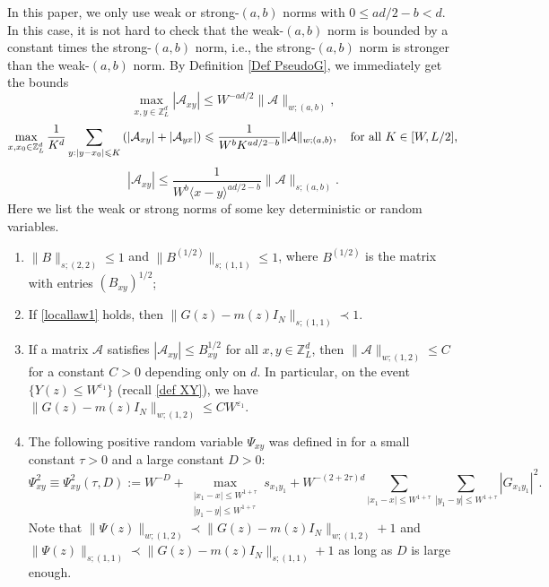 \documentclass{article}
\newcommand{\1}{\mathds{1}}
\numberwithin{equation}{section}
\newcommand{\be}{\begin{equation}}
\newcommand{\ee}{\end{equation}}
\newcommand{\e}{{\varepsilon}}
\renewcommand{\cal}{\mathcal}
\renewcommand{\leq}{\leqslant}
\renewcommand{\le}{\leq}
\newcommand{\Z}{\mathbb{Z}}
\DeclareMathOperator{\OO}{O}
\theoremstyle{plain} %
\theoremstyle{remark}
\begin{document}
In this paper, we only use weak or strong-$(a,b)$ norms with $0\le ad/2-b<d$. In this case, it is not hard to check that the weak-$(a,b)$ norm is bounded by a constant times the strong-$(a,b)$ norm, i.e., the strong-$(a,b)$ norm is stronger than the weak-$(a,b)$ norm. By Definition \ref{Def PseudoG}, we immediately get the bounds
\be\label{eq PseudoG2} 
\max_{x,y\in \Z_L^d} \left|\cal A_{xy}\right| \le W^{-a d/2}\|\cal A\|_{w;(a,b)},
\ee
\be\label{eq PseudoG}
\max_{x, x_0\in \Z_L^d} \frac1{ K^{d}}\sum_{y:| y - x_0 |\le K} \left(\left|\cal A_{xy}\right|+\left| \cal A_{yx}\right| \right)\le   \frac{1}{W^b K^{ad/2-b}}  \|\cal A\|_{w;(a,b)},\quad \text{for all $  K \in [W, L/2]$,}
\ee
\be\label{eq unifG}
\left|\cal A_{xy}\right| \le    \frac{1}{W^b \langle x-y\rangle^{ad/2-b}} \|\cal A\|_{s;(a,b)}.
\ee
Here we list the weak or strong norms of some key deterministic or random variables. 
\begin{enumerate}
\item %
$\|B\|_{s;(2,2)}\le 1$ and $\|B^{(1/2)}\|_{s;(1,1)}\le 1$, where $B^{(1/2)}$ is the matrix with entries $(B_{xy})^{1/2}$; %

\item If \eqref{locallaw1} holds, then $\|G(z)-m(z)I_N\|_{s;(1,1)}\prec 1$. %

\item If a matrix $\cal A$ satisfies $|\cal A_{xy}|\le B_{xy}^{1/2}$ for all $x,y\in \Z_L^d$, then $\|\cal A\|_{w;(1,2)}\le C$ for a constant $C>0$ depending only on $d$. In particular, on the event $\{Y(z)\le W^{\e_1}\}$ (recall \eqref{def XY}), we have $\|G(z)-m(z)I_N\|_{w;(1,2)}\le CW^{\e_1}$.



\item The following positive random variable $\Psi_{xy}$ was defined in \cite[Definition 3.4]{PartIII} for a small constant $\tau>0$ and a large constant $D>0$:
\be\label{eq defPsi}
\Psi^2_{xy}\equiv \Psi^2_{xy}(\tau,D) :=W^{-D}+ \max\limits_{ \substack{|x_1-x| \le   W^{1+\tau}  \\ |y_1-y|\le  W^{1+\tau}}}s_{x_1y_1} + W^{-(2+2\tau)d}\sum_{ |x_1-x| \le  W^{1+\tau}}\sum_{ |y_1-y|\le  W^{1+\tau}} |G_{x_1y_1}|^2  .\ee
Note that  $\|\Psi(z)\|_{w;(1,2)} \prec \|G(z)-m(z)I_N\|_{w;(1,2)} + 1$ and  $\|\Psi(z)\|_{s;(1,1)} \prec \|G(z)-m(z)I_N\|_{s;(1,1)} + 1$ as long as $D$ is large enough.

\end{enumerate}
\end{document}
